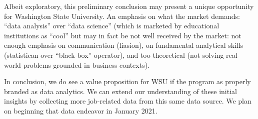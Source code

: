 \documentclass[]{article}
\begin{document}
Albeit exploratory, this preliminary conclusion may present a unique
opportunity for Washington State University. An emphasis on what the
market demands: ``data analysis'' over ``data science'' (which is
marketed by educational institutions as ``cool'' but may in fact be not
well received by the market: not enough emphasis on communication
(liasion), on fundamental analytical skills (statistican over
``black-box'' operator), and too theoretical (not solving real-world
problems grounded in business contexts).

In conclusion, we do see a value proposition for WSU if the program as
properly branded as data analytics. We can extend our understanding of
these initial insights by collecting more job-related data from this
same data source. We plan on beginning that data endeavor in January
2021.






\newpage
\theendnotes

\newpage
\begin{auxmulticols}{1}
\singlespacing 


\end{auxmulticols}

\newpage
{
\hypersetup{linkcolor=black}
\setcounter{tocdepth}{3}
\tableofcontents
}
\end{document}
